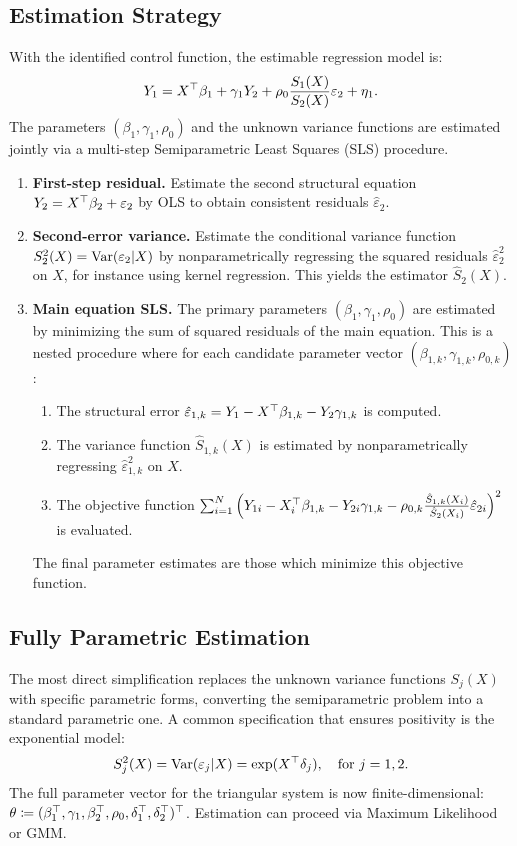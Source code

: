 \subsection{Estimation Strategy}
With the identified control function, the estimable regression model is:
\[
Y_1 = X^{\top}\beta_1 + \gamma_1 Y_2 + \rho_0 \frac{S_1(X)}{S_2(X)}\varepsilon_2 + \eta_1.
\]
The parameters $(\beta_1, \gamma_1, \rho_0)$ and the unknown variance functions are estimated jointly via a multi-step Semiparametric Least Squares (SLS) procedure.
\begin{enumerate}
    \itemsep2pt
    \item \textbf{First-step residual.} Estimate the second structural equation $Y_2 = X^{\top}\beta_2 + \varepsilon_2$ by OLS to obtain consistent residuals $\hat{\varepsilon}_2$.
    \item \textbf{Second-error variance.} Estimate the conditional variance function $S_2^2(X) = \operatorname{Var}(\varepsilon_2|X)$ by nonparametrically regressing the squared residuals $\hat{\varepsilon}_2^2$ on $X$, for instance using kernel regression. This yields the estimator $\hat{S}_2(X)$.
    \item \textbf{Main equation SLS.} The primary parameters $(\beta_1, \gamma_1, \rho_0)$ are estimated by minimizing the sum of squared residuals of the main equation. This is a nested procedure where for each candidate parameter vector $(\beta_{1,k}, \gamma_{1,k}, \rho_{0,k})$:
    \begin{enumerate}[label=(\alph*)]
        \itemsep1pt
        \item The structural error $\hat{\varepsilon}_{1,k} = Y_1 - X^{\top}\beta_{1,k} - Y_2\gamma_{1,k}$ is computed.
        \item The variance function $\hat{S}_{1,k}(X)$ is estimated by nonparametrically regressing $\hat{\varepsilon}_{1,k}^2$ on $X$.
        \item The objective function $\sum_{i=1}^N \left( Y_{1i} - X_i^{\top}\beta_{1,k} - Y_{2i}\gamma_{1,k} - \rho_{0,k}\frac{\hat{S}_{1,k}(X_i)}{\hat{S}_2(X_i)}\hat{\varepsilon}_{2i} \right)^2$ is evaluated.
    \end{enumerate}
    The final parameter estimates are those which minimize this objective function.
\end{enumerate}

\subsection{Fully Parametric Estimation}
The most direct simplification replaces the unknown variance functions $S_j(X)$ with specific parametric forms, converting the semiparametric problem into a standard parametric one. A common specification that ensures positivity is the exponential model:
\[
S_j^2(X) = \operatorname{Var}(\varepsilon_j|X) = \exp(X^{\top}\delta_j), \quad \text{for } j=1,2.
\]
The full parameter vector for the triangular system is now finite-dimensional: $\theta \coloneqq (\beta_1^{\top}, \gamma_1, \beta_2^{\top}, \rho_0, \delta_1^{\top}, \delta_2^{\top})^{\top}$. Estimation can proceed via Maximum Likelihood or GMM.

